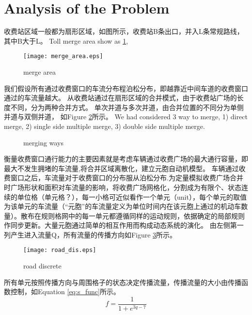 \documentclass{mcmthesis}
\begin{document}
\section{Analysis of the Problem}
收费站区域一般都为扇形区域，如图所示，收费站B条出口，并入L条常规路线，其中B大于L。
Toll merge area show as \ref{fig:merge_area},\cite{woo1991toll}
\begin{figure}[!h]
	\centering
	\texttt{[image: merge\_area.eps]}
	\caption{merge area}
	\label{fig:merge_area}
\end{figure}
我们假设所有通过收费窗口的车流分布程泊松分布，即越靠近中间车道的收费窗口通过的车流量越大。
从收费站通过在扇形区域的合并模式，由于收费站广场的长度不同，分为两种合并方式。
单次并道与多次并道，由合并位置的不同分为单侧并道与双侧并道，
如Figure \ref{fig:merge_ways}所示。
We had considered 3 way to merge, 1) direct merge, 2) single side multiple merge, 3) double side multiple merge.
\begin{figure}[!htbp]
	\centering
	\caption{merging ways}
	\label{fig:merge_ways}
\end{figure}
衡量收费窗口通行能力的主要因素就是考虑车辆通过收费广场的最大通行容量，即最大不发生拥堵的车流量,将合并区域离散化，建立元胞自动机模型。
车辆通过收费窗口之后，车流量对于收费窗口的分布服从泊松分布.为定量模拟收费广场合并时广场形状和面积对车流量的影响，将收费广场网格化，分割成为有限个、状态连续的单位格（单元格？），每一小格可近似看作一个单元（unit），每个单元的取值为该单元的车流量（“元胞”的车流量定义为单位时间内在该元胞上通过的机动车数量）。散布在规则格网中的每一单元都遵循同样的运动规则，依据确定的局部规则作同步更新。大量元胞通过简单的相互作用而构成动态系统的演化。
由左侧第一列产生进入流量Q，所有流量的传播方向如Figure \ref{fig:road_dis}所示。
\begin{figure}[h]
\small
\centering
\texttt{[image: road\_dis.eps]}
\caption{road discrete} 
\label{fig:road_dis}
\end{figure}
所有单元按照传播方向与周围格子的状态决定传播流量，传播流量的大小由传播函数控制，如Equation \ref{eq:s_func}所示。
\begin{equation}
f=\frac{1}{1+e^{3q-7}}
\label{eq:s_func}
\end{equation}
\end{document}

